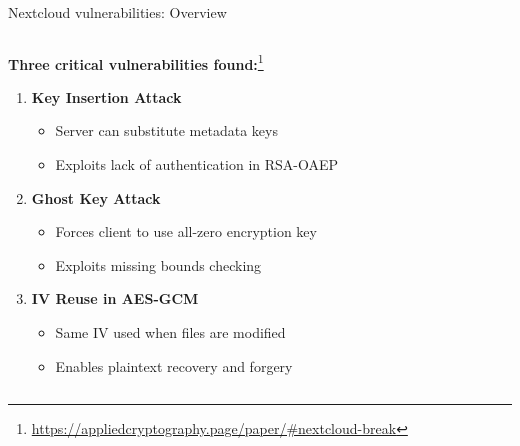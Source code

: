 \documentclass[aspectratio=169, lualatex, handout]{beamer}
\begin{document}
\begin{frame}{Nextcloud vulnerabilities: Overview}
	\begin{columns}[c]
		\begin{column}{1\textwidth}
			\textbf{Three critical vulnerabilities found:}\footnote{\url{https://appliedcryptography.page/paper/\#nextcloud-break}}
			\begin{enumerate}
				\item \textbf{Key Insertion Attack}
				      \begin{itemize}
					      \item Server can substitute metadata keys
					      \item Exploits lack of authentication in RSA-OAEP
				      \end{itemize}
				\item \textbf{Ghost Key Attack}
				      \begin{itemize}
					      \item Forces client to use all-zero encryption key
					      \item Exploits missing bounds checking
				      \end{itemize}
				\item \textbf{IV Reuse in AES-GCM}
				      \begin{itemize}
					      \item Same IV used when files are modified
					      \item Enables plaintext recovery and forgery
				      \end{itemize}
			\end{enumerate}
		\end{column}
	\end{columns}
\end{frame}
\end{document}
